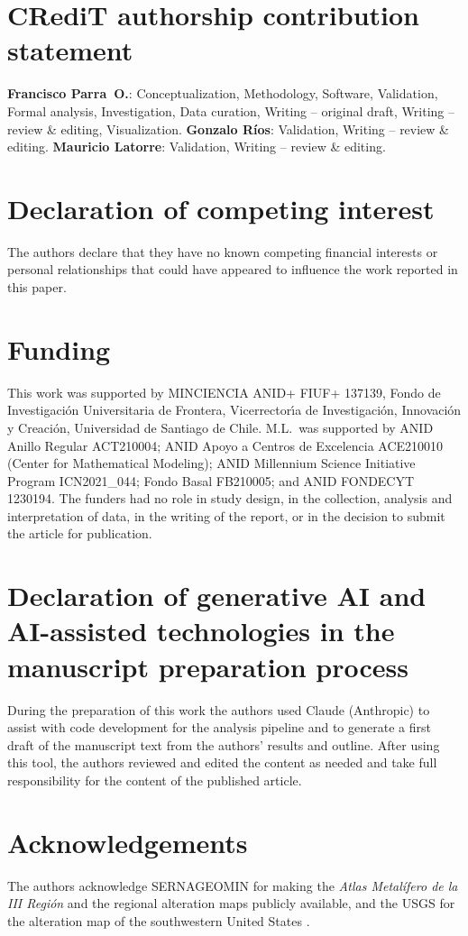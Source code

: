 \documentclass[preprint,authoryear,number]{elsarticle}
\begin{document}
\section*{CRediT authorship contribution statement}

\textbf{Francisco Parra~O.}: Conceptualization, Methodology, Software, Validation, Formal analysis, Investigation, Data curation, Writing -- original draft, Writing -- review \& editing, Visualization.
\textbf{Gonzalo R\'ios}: Validation, Writing -- review \& editing.
\textbf{Mauricio Latorre}: Validation, Writing -- review \& editing.

\section*{Declaration of competing interest}

The authors declare that they have no known competing financial interests or personal relationships that could have appeared to influence the work reported in this paper.

\section*{Funding}

This work was supported by MINCIENCIA ANID+ FIUF+ 137139, Fondo de Investigaci\'on Universitaria de Frontera, Vicerrector\'\i a de Investigaci\'on, Innovaci\'on y Creaci\'on, Universidad de Santiago de Chile. M.L.\ was supported by ANID Anillo Regular ACT210004; ANID Apoyo a Centros de Excelencia ACE210010 (Center for Mathematical Modeling); ANID Millennium Science Initiative Program ICN2021\_044; Fondo Basal FB210005; and ANID FONDECYT 1230194. The funders had no role in study design, in the collection, analysis and interpretation of data, in the writing of the report, or in the decision to submit the article for publication.

\section*{Declaration of generative AI and AI-assisted technologies in the manuscript preparation process}

During the preparation of this work the authors used Claude (Anthropic) to assist with code development for the analysis pipeline and to generate a first draft of the manuscript text from the authors' results and outline. After using this tool, the authors reviewed and edited the content as needed and take full responsibility for the content of the published article.

\section*{Acknowledgements}

The authors acknowledge SERNAGEOMIN for making the \emph{Atlas Metal\'ifero de la III Regi\'on} and the regional alteration maps publicly available, and the USGS for the alteration map of the southwestern United States \citep{Rockwell2017}.



\end{document}
